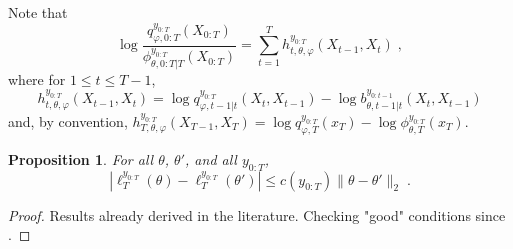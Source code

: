 \documentclass{article}
\newtheorem{proposition}[theorem]{Proposition}
\newcommand{\1}{\mathbbm{1}}
\newcommand{\eqsp}{\;}
\begin{document}
Note that
$$
\log \frac{q^{y_{0:T}}_{\varphi,0:T}(X_{0:T})}{\phi^{y_{0:T}}_{\theta,0:T|T}(X_{0:T})} = \sum_{t=1}^Th^{y_{0:T}}_{t,\theta,\varphi}(X_{t-1},X_t)\eqsp,
$$
where for $1\leq t \leq T-1$, 
\begin{equation}
\label{eq:def:addfunc}
h^{y_{0:T}}_{t,\theta,\varphi}(X_{t-1},X_t) = \log q^{y_{0:T}}_{\varphi,t-1|t}(X_t,X_{t-1}) - \log b^{y_{0:t-1}}_{\theta,t-1|t}(X_t,X_{t-1})
\end{equation} 
and, by convention,  $h^{y_{0:T}}_{T,\theta,\varphi}(X_{T-1},X_T) = \log q^{y_{0:T}}_{\varphi,T}(x_T) - \log \phi^{y_{0:T}}_{\theta,T}(x_T)$. 
\begin{proposition}
\label{prop:loglikelihood:lipschitz}
For all $\theta$, $\theta'$, and all $y_{0:T}$,
$$
\left|\ell_T^{y_{0:T}}(\theta) - \ell_T^{y_{0:T}}(\theta')\right| \leq c(y_{0:T})\|\theta-\theta'\|_2\eqsp.
$$
\end{proposition}
\begin{proof}
Results already derived in the literature. Checking "good" conditions since \cite{douc2001asymptotics}.
\end{proof}
\end{document}
